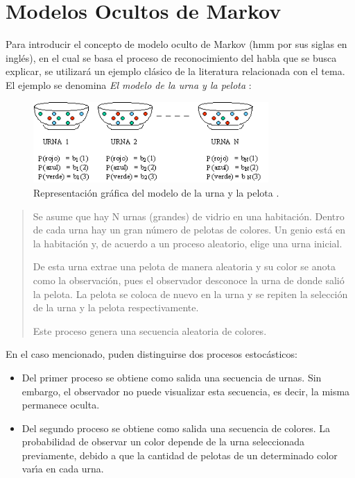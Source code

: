 \section{Modelos Ocultos de Markov}
\label{sec:hmm}

Para introducir el concepto de modelo oculto de Markov (\gls{hmm} por sus siglas en ingl\'es), 
en el cual se basa el proceso de reconocimiento del habla que se busca explicar, 
se utilizar\'a un ejemplo cl\'asico de la literatura relacionada con el tema.
El ejemplo se denomina \emph{El modelo de la urna y la pelota} \cite{Rabiner89atutorial}:

\begin{figure}[H] 
\centering
\includegraphics[width=0.8\textwidth]{./graphics/urnas.png}
\caption{Representaci\'on gr\'afica del modelo de la urna y la pelota \cite{LleidaModelado}.}
\label{figure:urnas}
\end{figure}

\begin{quote}
	Se asume que hay N urnas (grandes) de vidrio en una habitaci\'on. Dentro de cada urna hay un gran 
	n\'umero de pelotas de colores. Un genio est\'a en la habitaci\'on y, de acuerdo a un proceso aleatorio, elige una urna inicial.

	De esta urna extrae una pelota de manera aleatoria y su color se anota como la observaci\'on, 
	pues el observador desconoce la urna de donde sali\'o la pelota.
	La pelota se coloca de nuevo en la urna y se repiten la selecci\'on de la urna y la pelota respectivamente.
	
	Este proceso genera una secuencia aleatoria de colores.
\end{quote}
\vspace*{1\baselineskip}

En el caso mencionado, puden distinguirse dos procesos estoc\'asticos:
\begin{itemize}
	\item Del primer proceso se obtiene como salida una secuencia de urnas. Sin embargo, el observador
	no puede visualizar esta secuencia, es decir, la misma permanece oculta.
	\item Del segundo proceso se obtiene como salida una secuencia de colores. La probabilidad de observar
	un color depende de la urna seleccionada previamente, debido a que la cantidad de pelotas de un determinado
	color var{\'\i}a en cada urna.
\end{itemize}

